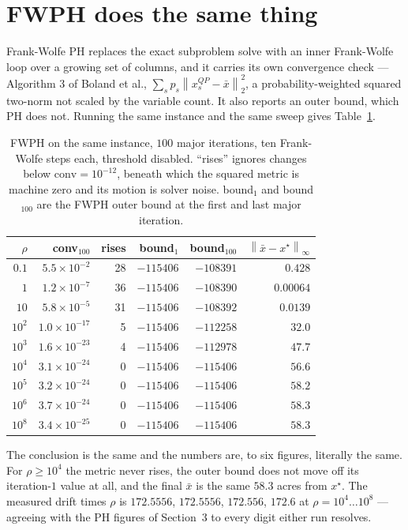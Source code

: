 \documentclass[11pt]{article}
\newcommand{\norm}[1]{\left\lVert #1 \right\rVert}
\newcommand{\xbar}{\bar{x}}
\begin{document}
\section{FWPH does the same thing}

Frank-Wolfe PH \cite{boland} replaces the exact subproblem solve with an inner
Frank-Wolfe loop over a growing set of columns, and it carries its own
convergence check --- Algorithm 3 of Boland et al., $\sum_s p_s \norm{x_s^{QP}
- \xbar}_2^2$, a probability-weighted squared two-norm not scaled by the
variable count.  It also reports an outer bound, which PH does not.  Running
the same instance and the same sweep gives Table~\ref{tab:fwph}.

\begin{table}[h]
\centering
\begin{tabular}{rrrrrr}
\toprule
$\rho$ & conv$_{100}$ & rises & bound$_1$ & bound$_{100}$ & $\norm{\xbar - x^\star}_\infty$ \\
\midrule
$0.1$    & $5.5\times10^{-2}$  & 28 & $-115406$ & $-108391$ & $0.428$ \\
$1$      & $1.2\times10^{-7}$  & 36 & $-115406$ & $-108390$ & $0.00064$ \\
$10$     & $5.8\times10^{-5}$  & 31 & $-115406$ & $-108392$ & $0.0139$ \\
$10^{2}$ & $1.0\times10^{-17}$ &  5 & $-115406$ & $-112258$ & $32.0$ \\
$10^{3}$ & $1.6\times10^{-23}$ &  4 & $-115406$ & $-112978$ & $47.7$ \\
$10^{4}$ & $3.1\times10^{-24}$ &  0 & $-115406$ & $-115406$ & $56.6$ \\
$10^{5}$ & $3.2\times10^{-24}$ &  0 & $-115406$ & $-115406$ & $58.2$ \\
$10^{6}$ & $3.7\times10^{-24}$ &  0 & $-115406$ & $-115406$ & $58.3$ \\
$10^{8}$ & $3.4\times10^{-25}$ &  0 & $-115406$ & $-115406$ & $58.3$ \\
\bottomrule
\end{tabular}
\caption{FWPH on the same instance, $100$ major iterations, ten Frank-Wolfe
steps each, threshold disabled.  ``rises'' ignores changes below
$\mathrm{conv} = 10^{-12}$, beneath which the squared metric is machine zero
and its motion is solver noise.  bound$_1$ and bound$_{100}$ are the FWPH
outer bound at the first and last major iteration.}
\label{tab:fwph}
\end{table}

The conclusion is the same and the numbers are, to six figures, literally the
same.  For $\rho \ge 10^4$ the metric never rises, the outer bound does not
move off its iteration-$1$ value at all, and the final $\xbar$ is the same
$58.3$ acres from $x^\star$.  The measured drift times $\rho$ is
$172.5556$, $172.5556$, $172.556$, $172.6$ at $\rho = 10^4 \dots 10^8$ ---
agreeing with the PH figures of Section~3 to every digit either run resolves.
\end{document}
